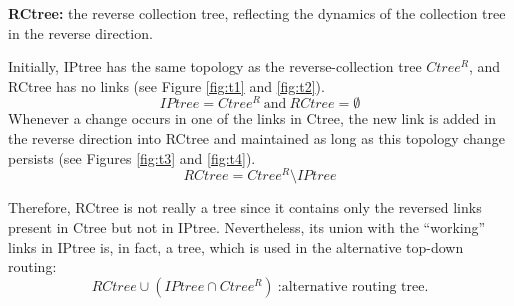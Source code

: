 	\textbf{RCtree:} the reverse collection tree, reflecting the
  dynamics of the collection tree in the reverse direction.

Initially, IPtree has the same topology as the reverse-collection tree
$Ctree^{R}$, and RCtree has no links (see Figure \ref{fig:t1} and
\ref{fig:t2}).
$$
IPtree = Ctree^{R} \ \text{and} \ RCtree = \emptyset
$$
Whenever a change occurs in one of the links in Ctree, the new link
is added in the reverse direction into RCtree and maintained as long
as this topology change persists (see Figures \ref{fig:t3} and
\ref{fig:t4}).
$$
RCtree = Ctree^{R} \setminus IPtree
$$

Therefore, RCtree is not really a tree since it contains only the
reversed links present in Ctree but not in IPtree. Nevertheless, its
union with the ``working'' links in IPtree is, in fact, a tree,
which is used in the alternative top-down routing:
$$
RCtree \cup (IPtree \cap Ctree^{R}) \  \text{:alternative routing tree.}
$$

